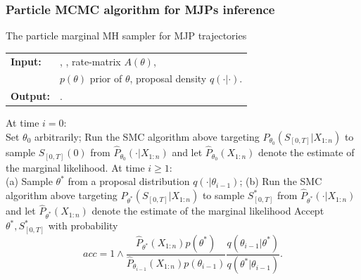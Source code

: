 \subsubsection{Particle MCMC algorithm for MJPs inference}

\begin{algorithm}[H]
  \caption{The particle marginal MH sampler for MJP trajectories}
   \label{alg:SMC}
  \begin{tabular}{l l}
   \textbf{Input:  } & \text{Prior $\pi_0$, observations $X$}, 
                       \text{Number of particles $N$}, rate-matrix $A(\theta)$,\\
                     & $p(\theta)$ prior of $\theta$, proposal density $q(\cdot|\cdot)$. \\
   \textbf{Output:  }& \text{New MJP trajectory $S' (t) = (s'_0, S', T')$}.\\
   \hline
   \end{tabular}
   \begin{algorithmic}[1]
\State At time $i = 0$:\\
\noindent Set $\theta_0$ arbitrarily;
\noindent Run the SMC algorithm above targeting $P_{\theta_0}(S_{[0, T]} | X_{1:n})$ to sample $S_{[0, T]}(0)$ from $\hat{P}_{\theta_0}(\cdot | X_{1:n})$ and let $\hat{P}_{\theta_0}(X_{1:n})$ denote the estimate of the marginal likelihood.
\State At time $i \geq 1:$\\
\noindent \noindent (a) Sample $\theta^*$ from a proposal distribution $q(\cdot | \theta_{i - 1})$;
\noindent \noindent (b) Run the SMC algorithm above targeting $P_{\theta^*}(S_{[0, T]} | X_{1:n})$ to sample $S_{[0, T]}^*$ from $\hat{P}_{\theta^*}(\cdot | X_{1:n})$ and let $\hat{P}_{\theta^*}(X_{1:n})$ denote the estimate of the marginal likelihood
\noindent Accept $\theta^*, S_{[0, T]}^*$ with probability $$ acc = 1 \wedge \frac{\hat{P}_{\theta^*}(X_{1:n}) p(\theta^*)}{\hat{P}_{\theta_{i - 1}}(X_{1:n}) p(\theta_{i  - 1})} \frac{q(\theta_{i - 1} | \theta^*)}{q(\theta^* | \theta_{i - 1})}.$$

\end{algorithmic}
\end{algorithm}


